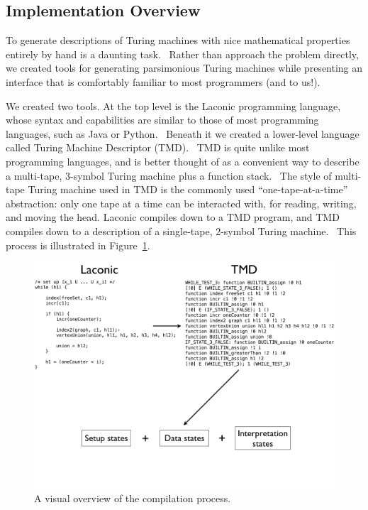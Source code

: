 \documentclass[11pt]{article}
\begin{document}
\subsection{Implementation Overview}

To generate descriptions of Turing machines with nice mathematical properties entirely by hand is a daunting task. \ Rather than approach the problem directly, we created tools for generating parsimonious Turing machines while presenting an interface that is comfortably familiar to most programmers (and to us!).

We created two tools. At the top level is the Laconic programming language, whose syntax and capabilities are similar to those of most programming languages, such as Java or Python. \ Beneath it we created a lower-level language called Turing Machine Descriptor (TMD). \ TMD is quite unlike most programming languages, and is better thought of as a convenient way to describe a multi-tape, 3-symbol Turing machine plus a function stack. \ The style of multi-tape Turing machine used in TMD is the commonly used ``one-tape-at-a-time'' abstraction: only one tape at a time can be interacted with, for reading, writing, and moving the head. Laconic compiles down to a TMD program, and TMD compiles down to a description of a single-tape, 2-symbol Turing machine. \ This process is illustrated in Figure~\ref{fig:compilation}.

\begin{figure}
\begin{center}
\includegraphics[scale=0.42]{figs/compilation.png}
\caption{A visual overview of the compilation process. \label{fig:compilation}}
\end{center}
\end{figure}
\end{document}
